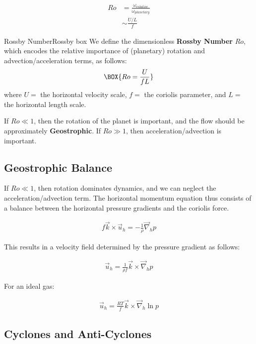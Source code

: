 \begin{align}
    Ro &= \frac{\omega_{relative}}{\omega_{planetary}}\\
    &\sim\frac{U/L}{f}
\end{align}

\begin{fact}{Rossby Number}{Rossby box}\label{Rossby Box}
    We define the dimensionless \textbf{Rossby Number} $Ro$, which encodes the relative importance of (planetary) rotation and advection/acceleration terms, as follows:
    \begin{gather}
        \BOX{
            Ro=\frac{U}{fL}
        }
    \end{gather}
    where $U=$ the horizontal velocity scale, $f=$ the coriolis parameter, and $L=$ the horizontal length scale. 
    
    If $Ro\ll 1$, then the rotation of the planet is important, and the flow should be approximately \textbf{Geostrophic}. If $Ro\gg 1$, then acceleration/advection is important.
\end{fact}

\subsection{Geostrophic Balance}

If $Ro\ll 1$, then rotation dominates dynamics, and we can neglect the acceleration/advection term. The horizontal momentum equation thus consists of a balance between the horizontal pressure gradients and the coriolis force. 

\begin{align*}
    f\vec{k}\times\vec{u}_h=-\frac{1}{\rho}\vec{\nabla}_hp
\end{align*}

\noindent This results in a velocity field determined by the pressure gradient as follows:

\begin{align}\label{Geostrophic Balance}
    \boxed{\vec{u}_h=\frac{1}{\rho f}\vec{k}\times\vec{\nabla}_hp}
\end{align}

For an ideal gas:

\begin{align}
    \vec{u}_h=\frac{RT}{ f}\vec{k}\times\vec{\nabla}_h\ln p
\end{align}

\subsection{Cyclones and Anti-Cyclones}

